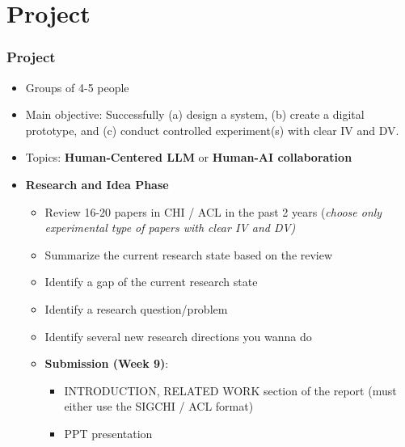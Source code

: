\documentclass{beamer}
\begin{document}
\section{Project} %

\begin{frame}
\frametitle{Project}
\footnotesize
\begin{itemize}
	\item Groups of 4-5 people
	\item Main objective:  Successfully (a) design a system,  (b) create a digital prototype,  and (c) conduct controlled experiment(s) with clear IV and DV.   
    \item Topics:  \textbf{Human-Centered LLM} or \textbf{Human-AI collaboration}
	\item \textbf{Research and Idea Phase}
	\begin{itemize}
		\item Review 16-20 papers in CHI / ACL in the past 2 years (\textit{choose only experimental type of papers with clear IV and DV)}
		\item Summarize the current research state based on the review
		\item Identify a gap of the current research state
		\item Identify a research question/problem
		\item Identify several new research directions you wanna do
		\item \textbf{Submission (Week 9)}:
		\begin{itemize}
			\item  INTRODUCTION, RELATED WORK section of the report (must either use the SIGCHI / ACL format)
			\item PPT presentation
		\end{itemize}
	\end{itemize}
\end{itemize}
\end{frame}
\end{document}
